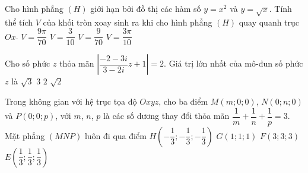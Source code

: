 \begin{ex}%
Cho hình phẳng $(H)$ giới hạn bởi đồ thị các hàm số $y = x^2$ và $y = \sqrt{x}$. Tính thể tích $V$ của khối tròn xoay sinh ra khi cho hình phẳng $(H)$ quay quanh trục $Ox$.
\choice
{$V = \dfrac{9\pi}{70}$}
{$V = \dfrac{3}{10}$}
{$V = \dfrac{9}{70}$}
{\True $V = \dfrac{3\pi}{10}$}
\end{ex}

\begin{ex}%
Cho số phức $z$ thỏa mãn $\left| \dfrac{-2-3i}{3-2i}z+1\right| = 2$. Giá trị lớn nhất của mô-đun số phức $z$ là
\choice
{$\sqrt{3}$}
{\True $3$}
{$2$}
{$\sqrt{2}$}
\end{ex}

\begin{ex}%
Trong không gian với hệ trục tọa độ $Oxyz$, cho ba điểm $M(m;0;0)$, $N(0;n;0)$ và $P(0;0;p)$, với $m$, $n$, $p$ là các số dương thay đổi thỏa mãn $\dfrac{1}{m}+\dfrac{1}{n} + \dfrac{1}{p} = 3$. Mặt phẳng $(MNP)$ luôn đi qua điểm
\choice
{$H\left(-\dfrac{1}{3};-\dfrac{1}{3};-\dfrac{1}{3}\right)$}
{$G(1;1;1)$}
{$F(3;3;3)$}
{\True $E\left(\dfrac{1}{3};\dfrac{1}{3};\dfrac{1}{3}\right)$}
\end{ex}

